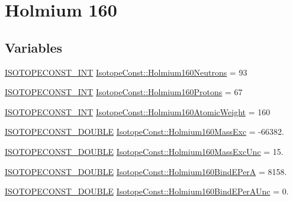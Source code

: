 \hypertarget{group___isotope_const-_holmium-_ho160}{}\section{Holmium 160}
\label{group___isotope_const-_holmium-_ho160}
\subsection*{Variables}
\begin{DoxyCompactItemize}
\item 
\mbox{\hyperlink{group___isotope_const-_macros_ga5f18360b3e99483a35c32d789e62621c}{I\+S\+O\+T\+O\+P\+E\+C\+O\+N\+S\+T\+\_\+\+I\+NT}} \mbox{\hyperlink{group___isotope_const-_holmium-_ho160_gae344c5a9e102a4d6bc37073aceb35a3b}{Isotope\+Const\+::\+Holmium160\+Neutrons}} = 93
\item 
\mbox{\hyperlink{group___isotope_const-_macros_ga5f18360b3e99483a35c32d789e62621c}{I\+S\+O\+T\+O\+P\+E\+C\+O\+N\+S\+T\+\_\+\+I\+NT}} \mbox{\hyperlink{group___isotope_const-_holmium-_ho160_gad82b0632d74273774af2b075ad9a2980}{Isotope\+Const\+::\+Holmium160\+Protons}} = 67
\item 
\mbox{\hyperlink{group___isotope_const-_macros_ga5f18360b3e99483a35c32d789e62621c}{I\+S\+O\+T\+O\+P\+E\+C\+O\+N\+S\+T\+\_\+\+I\+NT}} \mbox{\hyperlink{group___isotope_const-_holmium-_ho160_ga25cf62511178aa88900d4cf37f0025a9}{Isotope\+Const\+::\+Holmium160\+Atomic\+Weight}} = 160
\item 
\mbox{\hyperlink{group___isotope_const-_macros_ga8f45a7272ce02c0b4c65c44636ed719a}{I\+S\+O\+T\+O\+P\+E\+C\+O\+N\+S\+T\+\_\+\+D\+O\+U\+B\+LE}} \mbox{\hyperlink{group___isotope_const-_holmium-_ho160_ga6f102d7f3496576f14c906b0fb474914}{Isotope\+Const\+::\+Holmium160\+Mass\+Exc}} = -\/66382.
\item 
\mbox{\hyperlink{group___isotope_const-_macros_ga8f45a7272ce02c0b4c65c44636ed719a}{I\+S\+O\+T\+O\+P\+E\+C\+O\+N\+S\+T\+\_\+\+D\+O\+U\+B\+LE}} \mbox{\hyperlink{group___isotope_const-_holmium-_ho160_gaa45d12c7af07cd948e12ae012d12c78f}{Isotope\+Const\+::\+Holmium160\+Mass\+Exc\+Unc}} = 15.
\item 
\mbox{\hyperlink{group___isotope_const-_macros_ga8f45a7272ce02c0b4c65c44636ed719a}{I\+S\+O\+T\+O\+P\+E\+C\+O\+N\+S\+T\+\_\+\+D\+O\+U\+B\+LE}} \mbox{\hyperlink{group___isotope_const-_holmium-_ho160_ga52f37b177ce29986f1d279ac0cedb67a}{Isotope\+Const\+::\+Holmium160\+Bind\+E\+PerA}} = 8158.
\item 
\mbox{\hyperlink{group___isotope_const-_macros_ga8f45a7272ce02c0b4c65c44636ed719a}{I\+S\+O\+T\+O\+P\+E\+C\+O\+N\+S\+T\+\_\+\+D\+O\+U\+B\+LE}} \mbox{\hyperlink{group___isotope_const-_holmium-_ho160_ga5945ce7b018eafd6d198dbcfd3601485}{Isotope\+Const\+::\+Holmium160\+Bind\+E\+Per\+A\+Unc}} = 0.

\end{DoxyCompactItemize}
